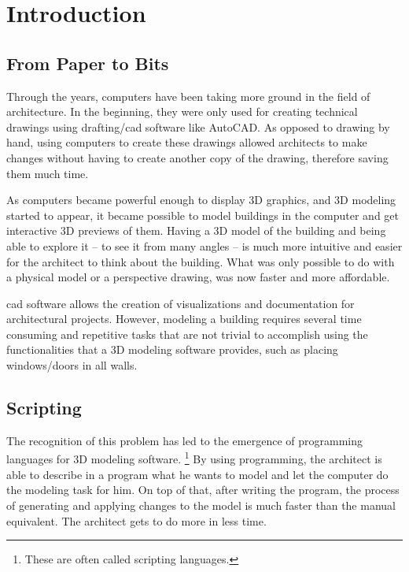 
\chapter{Introduction}
\label{chapter:introduction}


\section{From Paper to Bits}

Through the years, computers have been taking more ground in the field of architecture.
In the beginning, they were only used for creating technical drawings using drafting/\gls{cad} software like AutoCAD.
As opposed to drawing by hand, using computers to create these drawings allowed architects to make changes without having to create another copy of the drawing, therefore saving them much time.

As computers became powerful enough to display 3D graphics, and 3D modeling started to appear, it became possible to model buildings in the computer and get interactive 3D previews of them.
Having a 3D model of the building and being able to explore it -- to see it from many angles -- is much more intuitive and easier for the architect to think about the building.
What was only possible to do with a physical model or a perspective drawing, was now faster and more affordable.

\gls{cad} software allows the creation of visualizations and documentation for architectural projects.
However, modeling a building requires several time consuming and repetitive tasks that are not trivial to accomplish using the functionalities that a 3D modeling software provides, such as placing windows/doors in all walls.


\section{Scripting}
The recognition of this problem has led to the emergence of programming languages for 3D modeling software.%
\footnote{These are often called scripting languages.}
By using programming, the architect is able to describe in a program what he wants to model and let the computer do the modeling task for him.
On top of that, after writing the program, the process of generating and applying changes to the model is much faster than the manual equivalent.
The architect gets to do more in less time.

